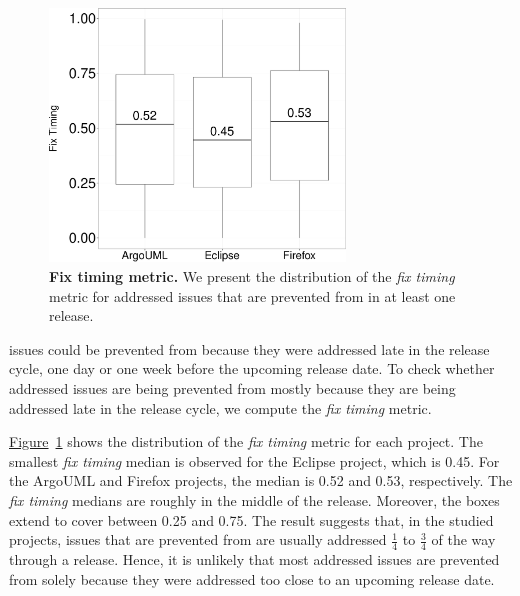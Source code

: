 \begin{figure}[!t]
	\centering
	\includegraphics[width=0.7\textwidth]
	{chapters/chapter4/figures/addressing_stage.pdf}
	\caption{\textbf{Fix timing metric.} We present the
		distribution of the \textit{fix timing} metric for addressed
		issues that are prevented from \DIFdelbeginFL {}\DIFdelendFL \DIFaddbeginFL {}\DIFaddendFL in at least one release.}
	\label{ch4:fig:boxplotTimeWindow}
\end{figure}

\noindent\DIFdelbegin \textit{\textbf{}%
} %
\DIFdelend \DIFaddbegin {} \DIFaddend issues could be prevented
from \DIFdelbegin {}\DIFdelend \DIFaddbegin {}\DIFaddend because they were addressed late in the release cycle, \eg one day
or one week before the upcoming release date. To check whether addressed issues are
being prevented from \DIFdelbegin {}\DIFdelend \DIFaddbegin {}\DIFaddend mostly because they are being addressed late in the
release cycle, we compute the \textit{fix timing} metric. 

\hyperref[ch4:fig:boxplotTimeWindow]{Figure}~\ref{ch4:fig:boxplotTimeWindow} shows the
distribution of the \textit{fix timing} metric for each project. The smallest
\textit{fix timing} median is observed for the Eclipse project, which is 0.45.
For the ArgoUML and Firefox projects, the median is 0.52 and 0.53, respectively.
The \textit{fix timing} medians are roughly in the middle of the release.
Moreover, the boxes extend to cover between 0.25 and 0.75. The result suggests
that, in the studied projects, issues that are prevented from \DIFdelbegin {}\DIFdelend \DIFaddbegin {}\DIFaddend are
usually addressed $\frac{1}{4}$ to $\frac{3}{4}$ of the way through a release.
Hence, it is unlikely that most addressed issues are prevented from \DIFdelbegin {}\DIFdelend \DIFaddbegin {}\DIFaddend solely because they were addressed too close to an upcoming release date.

